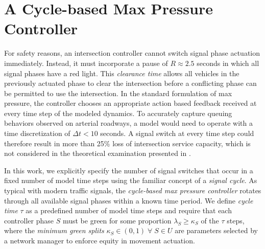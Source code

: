 \section{A Cycle-based Max Pressure Controller} 
For safety reasons, an intersection controller cannot switch signal phase actuation immediately. Instead, it must incorporate a pause of $R\approx2.5$ seconds in which all signal phases have a red light. This \emph{clearance time} allows all vehicles in the previously actuated phase to clear the intersection before a conflicting phase can be permitted to use the intersection. In the standard formulation of max pressure, the controller chooses an appropriate action based feedback received at every time step of the modeled dynamics. To accurately capture queuing behaviors observed on arterial roadways, a model would need to operate with a time discretization of $\Delta t< 10$ seconds. A signal switch at every time step could therefore result in more than 25\% loss of intersection service capacity, which is not considered in the theoretical examination presented in \cite{Varaiya2013}. 

In this work, we explicitly specify the number of signal switches that occur in a fixed number of model time steps using the familiar concept of a \emph{signal cycle}. As typical with modern traffic signals, the \emph{cycle-based max pressure controller} rotates through all available signal phases within a known time period. We define \emph{cycle time} $\tau$ as a predefined number of model time steps and require that each controller phase $S$ must be green for some proportion $\lambda_S \geq \kappa_S$ of the $\tau$ steps, where the \emph{minimum green splits} $\kappa_S \in (0,1) \; \forall \; S \in U $ are parameters selected by a network manager to enforce equity in movement actuation.  

